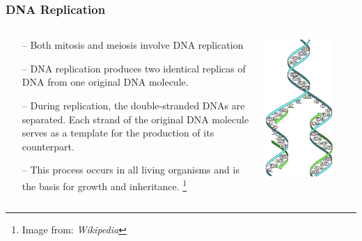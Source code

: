 \documentclass{beamer}
\newcommand\blfootnote[1]{%
	\begingroup
	\renewcommand\thefootnote{}\footnote{#1}%
	\addtocounter{footnote}{-1}%
	\endgroup
}
\begin{document}
\begin{frame}
	\frametitle{DNA Replication}
	\begin{columns}
		\begin{column}{0.6\textwidth}
			\begin{itemize}
				\item[--] Both mitosis and meiosis involve DNA replication
				\item[--] DNA replication produces two identical replicas of DNA from one original DNA molecule. 
				\item[--] During replication, the double-stranded DNAs are separated. Each strand of the original DNA molecule serves as a template for the production of its counterpart.
				\item[--]This process occurs in all living organisms and is the basis for growth and inheritance. 	
				\blfootnote{Image from: \textit{Wikipedia}}
			\end{itemize}		
		\end{column}			
		\begin{column}{0.5\textwidth}
			\centering \includegraphics[keepaspectratio, width  =0.75\textwidth]{img/DNA_replication} 
		\end{column}
	\end{columns}
\end{frame}
\end{document}
